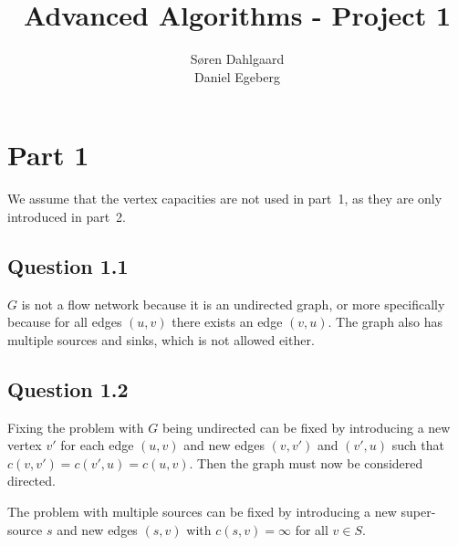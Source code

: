 \documentclass{sig-alternate}
\begin{document}
\title{Advanced Algorithms - Project 1}


\author{
\alignauthor
Søren Dahlgaard\\
\alignauthor
Daniel Egeberg\\
}

\maketitle

\begin{abstract}
\end{abstract}

\section{Part 1}
We assume that the vertex capacities are not used in part~1, as they are only
introduced in part~2.

\subsection*{Question 1.1}

$G$ is not a flow network because it is an undirected graph, or more
specifically because for all edges $(u,v)$ there exists an edge $(v,u)$. The
graph also has multiple sources and sinks, which is not allowed either.

\subsection*{Question 1.2}

Fixing the problem with $G$ being undirected can be fixed by introducing a
new vertex $v'$ for each edge $(u,v)$ and new edges $(v,v')$ and $(v',u)$
such that $c(v, v') = c(v', u) = c(u, v)$. Then the graph must now be
considered directed.

The problem with multiple sources can be fixed by introducing a new
super-source $s$ and new edges $(s, v)$ with $c(s, v)=\infty$ for all $v \in
S$.
\end{document}
